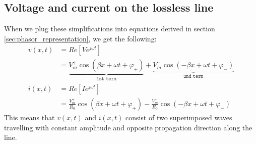 \documentclass[../transmission.tex]{subfiles}
\begin{document}
		\subsection{Voltage and current on the lossless line}
			When we plug these simplifications into equations derived in section \ref{sec:phasor_representation}, we get the following:
			\begin{align}
				v(x,t)&=Re[Ve^{j\omega t}]\\
				&=\underbrace{V^+_m\cos(\beta x+\omega t +\varphi_+)}_{\texttt{1st term}}+\underbrace{V_m^-\cos(-\beta x+\omega t+\varphi_-)}_{\texttt{2nd term}}\\
				i(x,t)&=Re[Ie^{j\omega t}]\\
				&=\frac{V^+_m}{R_0}\cos(\beta x+\omega t +\varphi_+)-\frac{V_m^-}{R_0}\cos(-\beta x+\omega t+\varphi_-)
			\end{align}
			This means that $v(x,t)$ and $i(x,t)$ consist of two superimposed waves travelling with constant amplitude and opposite propagation direction along the line.
		
\end{document}
